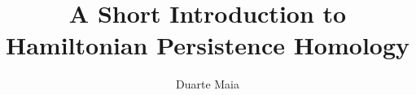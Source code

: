 \documentclass{article}
\title{A Short Introduction to Hamiltonian Persistence Homology}
\author{Duarte Maia}
\theoremstyle{nonumberplain}
\begin{document}
\maketitle

\pagebreak

\tableofcontents

\pagebreak










\end{document}
